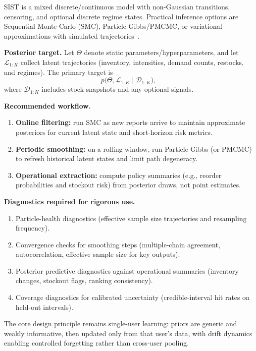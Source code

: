 \documentclass[11pt]{article}
\begin{document}
SIST is a mixed discrete/continuous model with non-Gaussian transitions, censoring, and optional discrete regime states. Practical inference options are Sequential Monte Carlo (SMC), Particle Gibbs/PMCMC, or variational approximations with simulated trajectories~\cite{GordonSalmondSmith1993,DoucetDeFreitasGordon2001,AndrieuDoucetHolenstein2010}.

\textbf{Posterior target.} Let $\Theta$ denote static parameters/hyperparameters, and let $\mathcal{L}_{1:K}$ collect latent trajectories (inventory, intensities, demand counts, restocks, and regimes). The primary target is
\[
  p\bigl(\Theta,\mathcal{L}_{1:K}\mid\mathcal{D}_{1:K}\bigr),
\]
where $\mathcal{D}_{1:K}$ includes stock snapshots and any optional signals.

\textbf{Recommended workflow.}
\begin{enumerate}
  \item \textbf{Online filtering:} run SMC as new reports arrive to maintain approximate posteriors for current latent state and short-horizon risk metrics.
  \item \textbf{Periodic smoothing:} on a rolling window, run Particle Gibbs (or PMCMC) to refresh historical latent states and limit path degeneracy.
  \item \textbf{Operational extraction:} compute policy summaries (e.g., reorder probabilities and stockout risk) from posterior draws, not point estimates.
\end{enumerate}

\textbf{Diagnostics required for rigorous use.}
\begin{enumerate}
  \item Particle-health diagnostics (effective sample size trajectories and resampling frequency).
  \item Convergence checks for smoothing steps (multiple-chain agreement, autocorrelation, effective sample size for key outputs).
  \item Posterior predictive diagnostics against operational summaries (inventory changes, stockout flags, ranking consistency).
  \item Coverage diagnostics for calibrated uncertainty (credible-interval hit rates on held-out intervals).
\end{enumerate}

The core design principle remains single-user learning: priors are generic and weakly informative, then updated only from that user's data, with drift dynamics enabling controlled forgetting rather than cross-user pooling.

\clearpage
\nocite{*}


\end{document}

